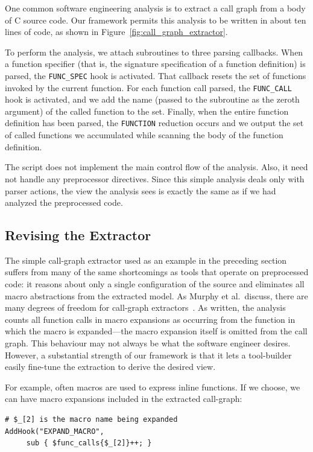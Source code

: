 \documentclass{article}
\newcommand{\C}{\mbox{C}}
\begin{document}
One common software engineering analysis is to extract a call graph from a
body of \C{} source code.  Our framework permits this analysis to be
written in about ten lines of code, as shown in
Figure~\ref{fig:call_graph_extractor}.

To perform the analysis, we attach subroutines to three parsing
callbacks.  When a function specifier (that is, 
the signature specification of a
function definition) is parsed, the \texttt{FUNC\_SPEC} hook is
activated.  That callback resets the set of functions invoked by
the current function.  For each function call parsed, the
\texttt{FUNC\_CALL} hook is activated, and we add the name (passed to
the subroutine as the zeroth argument) of the called function to the
set.  Finally, when the entire function definition has been parsed, the
\texttt{FUNCTION} reduction occurs and we output the set of called
functions we accumulated while scanning the body of the function
definition.

The script does not implement the main control flow of the
analysis.  Also, it need not handle any preprocessor directives.  Since
this simple analysis deals only with parser actions, the view the
analysis sees is exactly the same as if we had analyzed the preprocessed 
code.

\subsection*{Revising the Extractor}
\label{sec:call_graph_revised}
The simple call-graph extractor used as an example in the preceding
section suffers from many of the same shortcomings as tools that
operate on preprocessed code: it reasons about only a single
configuration of the source and eliminates all macro abstractions
from the extracted model.  As Murphy et al.\ discuss, there are many
degrees of freedom for call-graph extractors~\cite{Murphy98}.  As
written, the analysis counts all function calls in macro expansions as
occurring from the function in which the macro is expanded---the macro
expansion itself is omitted from the call graph.  This behaviour may not 
always be what the software engineer desires. However, a substantial
strength of our framework is that it lets a tool-builder easily
fine-tune the extraction to derive the desired view.

For example, often macros are used to express inline functions.  If we
choose, we can have macro expansions included in the extracted
call-graph:

\begin{verbatim}
# $_[2] is the macro name being expanded
AddHook("EXPAND_MACRO", 
     sub { $func_calls{$_[2]}++; }
\end{verbatim}
\end{document}
